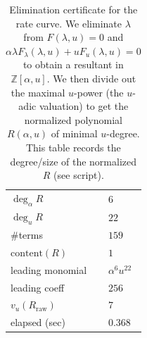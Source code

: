 \begin{table}[H]
\centering
\scriptsize
\setlength{\tabcolsep}{6pt}
\caption{Elimination certificate for the rate curve. We eliminate $\lambda$ from $F(\lambda,u)=0$ and $\alpha\lambda F_{\lambda}(\lambda,u)+uF_u(\lambda,u)=0$ to obtain a resultant in $\mathbb{Z}[\alpha,u]$. We then divide out the maximal $u$-power (the $u$-adic valuation) to get the normalized polynomial $R(\alpha,u)$ of minimal $u$-degree. This table records the degree/size of the normalized $R$ (see script).}
\label{tab:sync_kernel_rate_curve_resultant_degree}
\begin{tabular}{l l}
\toprule
$\deg_{\alpha} R$ & $6$\\
$\deg_{u} R$ & $22$\\
\#terms & $159$\\
$\mathrm{content}(R)$ & $1$\\
leading monomial & $\alpha^{6}u^{22}$\\
leading coeff & $256$\\
$v_u(R_{\mathrm{raw}})$ & $7$\\
elapsed (sec) & 0.368\\
\bottomrule
\end{tabular}
\end{table}
